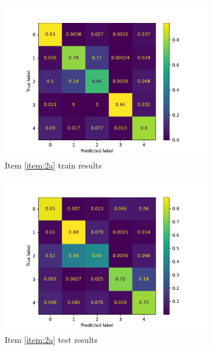 \documentclass[10pt, a4paper]{article}
\begin{document}
\begin{figure}[htpb]
  \centering
  \begin{subfigure}[b]{0.47\textwidth}
    \centering
    \includegraphics[width=\textwidth]{images/Patch32_scratch_cm_train.pdf}
    \caption{Item \ref{item:2a} train results}
    \label{fig:q2a_cm_train}
  \end{subfigure}
  \hfill
  \begin{subfigure}[b]{0.47\textwidth}
    \centering
    \includegraphics[width=\textwidth]{images/Patch32_scratch_cm_test.pdf}
    \caption{Item \ref{item:2a} test results}
    \label{fig:q2a_cm_test}
  \end{subfigure}
  \hfill
  \begin{subfigure}[b]{0.47\textwidth}

\end{subfigure}
\end{figure}
\end{document}
